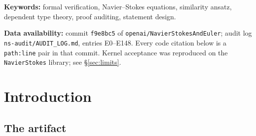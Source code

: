\documentclass[11pt]{article}
\newcommand{\ct}[1]{\texttt{#1}}
\newcommand{\file}[1]{\texttt{\small #1}}
\theoremstyle{plain}
\theoremstyle{definition}
\theoremstyle{remark}
\begin{document}
\begin{abstract}
(E80). E81 then compares them with the Euler paper's Theorem~1.1: the encoding is stronger than the paper in five respects and weaker in two---the challenge's $C^1$ limsup is the sum of the velocity and gradient suprema, while the paper asserts the gradient alone diverges, and the lifespan is taken over a Sobolev class not proved to contain the paper's smoothly evolving solution (E82); the development proves the gradient-only statement (\ct{maximalGradientNorm\_limsup}), its axiom footprint on a runner is the three permitted axioms with no \ct{sorryAx} (E84), and the Comparator target list does not contain it. Finally, the repository publishes the prose account it formalizes, and this audit now holds that account against the tree: the 166-page paper is mapped section by section onto the modules that realise it, ten sections and three appendices, each row labelled by what backs it---a citation in the source, an object match, or a family resemblance (E89). Five paper sections are named in the source at all, and eight of the thirteen rows rest on something weaker than a citation, so the map is section-level and not a clause-by-clause reconciliation.
\end{abstract}

\medskip
\noindent\textbf{Keywords:} formal verification, Navier--Stokes equations,
similarity ansatz, dependent type theory, proof auditing, statement design.

\noindent\textbf{Data availability:} commit \texttt{f9e8bc5} of
\texttt{openai/NavierStokesAndEuler}; audit log
\file{ns-audit/AUDIT\_LOG.md}, entries E0--E148. Every code citation below is a
\file{path:line} pair in that commit. Kernel acceptance was reproduced on the
\file{NavierStokes} library; see \S\ref{sec:limits}.

\tableofcontents

\section{Introduction}
\label{sec:intro}

\subsection{The artifact}
\end{document}
